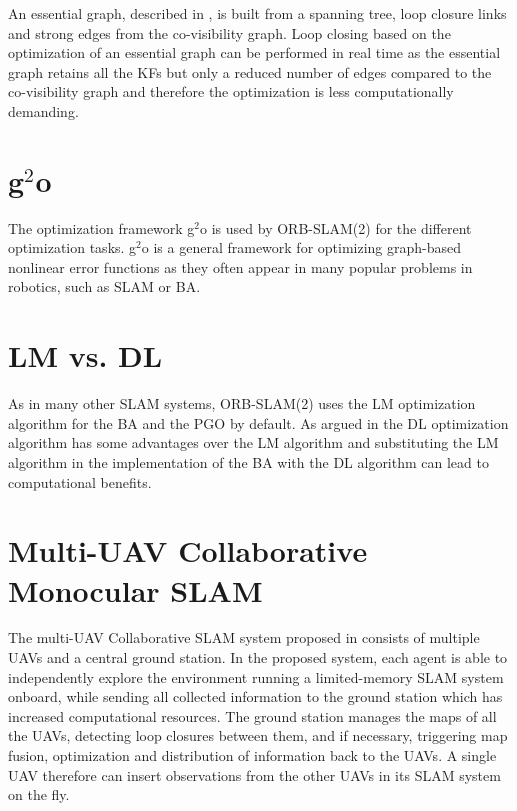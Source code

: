 An essential graph, described in \cite{Mur-Artal2015}, is built from a spanning tree, loop closure links and strong edges from the co-visibility graph. Loop closing based on the optimization of an essential graph can be performed in real time as the essential graph retains all the \acp{KF} but only a reduced number of edges compared to the co-visibility graph and therefore the optimization is less computationally demanding.

\section{g$^2$o}
The optimization framework g$^2$o \cite{Kummerle2011} is used by ORB-SLAM(2) for the different optimization tasks. g$^2$o is a general framework for optimizing graph-based nonlinear error functions as they often appear in many popular problems in robotics, such as \ac{SLAM} or \acf{BA}. 

\section{\acl{LM} vs. \acl{DL}}
As in many other \ac{SLAM} systems, ORB-SLAM(2) uses the \acf{LM} optimization algorithm for the \ac{BA} and the \acf{PGO} by default. As argued in \cite{Lourakis2005} the \acf{DL} optimization algorithm has some advantages over the \ac{LM} algorithm and substituting the \ac{LM} algorithm in the implementation of the \ac{BA} with the \ac{DL} algorithm can lead to computational benefits.

\section{Multi-UAV Collaborative Monocular SLAM}
The multi-\ac{UAV} Collaborative \ac{SLAM} system proposed in \cite{Schmuck2017} consists of multiple \acp{UAV} and a central ground station. In the proposed system, each agent is able to independently explore the environment running a limited-memory \ac{SLAM} system onboard, while sending all collected information to the ground station which has increased computational resources. The ground station manages the maps of all the \acp{UAV}, detecting loop closures between them, and if necessary, triggering map fusion, optimization and distribution of information back to the \acp{UAV}. A single \ac{UAV} therefore can insert observations from the other \acp{UAV} in its \ac{SLAM} system on the fly.
